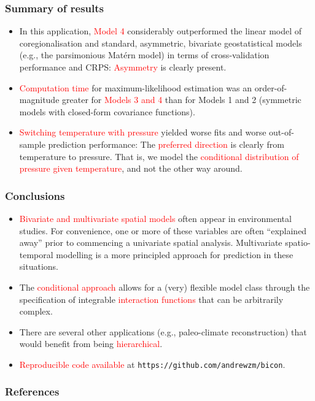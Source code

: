 \documentclass{beamer}
\newcommand{\red}{\textcolor{red}}%
\begin{document}

\begin{frame}
\frametitle{Summary of results}
\vspace{-0.2in}

\begin{itemize}
\item In this application, \red{Model 4} considerably outperformed the linear model of coregionalisation and standard, asymmetric, bivariate geostatistical models (e.g., the parsimonious Mat{\'e}rn model) in terms of cross-validation performance and CRPS: \red{Asymmetry} is clearly present.
\item \red{Computation time} for maximum-likelihood estimation was an order-of-magnitude greater for \red{Models 3 and 4} than for Models 1 and 2 (symmetric models with closed-form covariance functions).
\item \red{Switching temperature with pressure} yielded worse fits and worse out-of-sample prediction performance: The \red{preferred direction} is clearly from temperature to pressure. That is, we model the \red{conditional distribution of pressure given temperature}, and not the other way around.
\end{itemize}
\end{frame}


\begin{frame}
\frametitle{Conclusions}
\vspace{-.8cm}
\begin{itemize}
\item \textcolor{red}{Bivariate and multivariate spatial models} often appear in environmental studies. For convenience, one or more of these variables are often ``explained away'' prior to commencing a univariate spatial analysis. Multivariate spatio-temporal modelling is a more principled approach for prediction in these situations.
\item The \textcolor{red}{conditional approach} allows for a (very) flexible model class through the specification of integrable \textcolor{red}{interaction functions} that can be arbitrarily complex.
\item There are several other applications (e.g., paleo-climate reconstruction) that would benefit from being \red{hierarchical}.
\item \red{Reproducible code available} at \texttt{https://github.com/andrewzm/bicon}.
\end{itemize}
\end{frame}

\small

\begin{frame}[allowframebreaks]
\frametitle{References}


\vspace{-1cm}



\end{frame}
\end{document}
